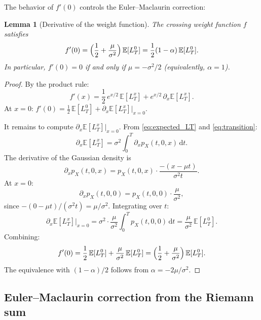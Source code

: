 \documentclass[11pt]{article}
\newtheorem{lemma}[theorem]{Lemma}
\theoremstyle{definition}
\theoremstyle{remark}
\newcommand{\E}{\mathbb{E}}
\newcommand{\dd}{\,\mathrm{d}}
\begin{document}
The behavior of $f'(0)$ controls the Euler--Maclaurin correction:

\begin{lemma}[Derivative of the weight function]\label{lem:f_prime}
The crossing weight function $f$ satisfies
\begin{equation}\label{eq:f_prime}
f'(0) = \Bigl(\frac{1}{2} + \frac{\mu}{\sigma^2}\Bigr)\,\E[L^0_T]
= \frac{1}{2}(1 - \alpha)\,\E[L^0_T].
\end{equation}
In particular, $f'(0) = 0$ if and only if
$\mu = -\sigma^2/2$ (equivalently, $\alpha = 1$).
\end{lemma}
\begin{proof}
By the product rule:
\begin{equation}\label{eq:f_prime_product}
f'(x) = \frac{1}{2}\,e^{x/2}\,\E[L^x_T]
+ e^{x/2}\,\partial_x \E[L^x_T].
\end{equation}
At $x = 0$: $f'(0) = \tfrac{1}{2}\,\E[L^0_T]
+ \partial_x\E[L^x_T]\big|_{x=0}$.

It remains to compute $\partial_x\E[L^x_T]\big|_{x=0}$.
From \eqref{eq:expected_LT} and \eqref{eq:transition}:
\begin{equation}\label{eq:dLdx}
\partial_x \E[L^x_T] = \sigma^2 \int_0^T
\partial_x p_X(t, 0, x)\dd t.
\end{equation}
The derivative of the Gaussian density is
\begin{equation}\label{eq:dp_dx}
\partial_x p_X(t, 0, x)
= p_X(t, 0, x) \cdot \frac{-(x - \mu t)}{\sigma^2 t}.
\end{equation}
At $x = 0$:
\begin{equation}\label{eq:dp_dx_0}
\partial_x p_X(t, 0, 0) = p_X(t, 0, 0) \cdot \frac{\mu}{\sigma^2},
\end{equation}
since $-(0 - \mu t)/(\sigma^2 t) = \mu/\sigma^2$.
Integrating over $t$:
\begin{equation}\label{eq:dL_dx_0}
\partial_x\E[L^x_T]\big|_{x=0}
= \sigma^2 \cdot \frac{\mu}{\sigma^2} \int_0^T p_X(t,0,0)\dd t
= \frac{\mu}{\sigma^2}\,\E[L^0_T].
\end{equation}
Combining:
\[
f'(0) = \frac{1}{2}\,\E[L^0_T] + \frac{\mu}{\sigma^2}\,\E[L^0_T]
= \Bigl(\frac{1}{2} + \frac{\mu}{\sigma^2}\Bigr)\,\E[L^0_T].
\]
The equivalence with $(1-\alpha)/2$ follows from
$\alpha = -2\mu/\sigma^2$.
\end{proof}

\subsection{Euler--Maclaurin correction from the Riemann sum}
\end{document}
